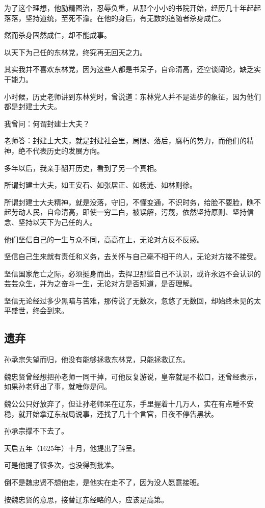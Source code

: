 \begin{multicols}{\theparacolNo}
为了这个理想，他励精图治，忍辱负重，从那个小小的书院开始，经历几十年起起落落，坚持道统，至死不渝。在他的身后，有无数的追随者杀身成仁。

然而杀身固然成仁，却不能成事。

以天下为己任的东林党，终究再无回天之力。

其实我并不喜欢东林党，因为这些人都是书呆子，自命清高，还空谈阔论，缺乏实干能力。

小时候，历史老师讲到东林党时，曾说道：东林党人并不是进步的象征，因为他们都是封建士大夫。

我曾问：何谓封建士大夫？

老师答：封建士大夫，就是封建社会里，局限、落后，腐朽的势力，而他们的精神，绝不代表历史的发展方向。

多年以后，我亲手翻开历史，看到了另一个真相。

所谓封建士大夫，如王安石、如张居正、如杨涟、如林则徐。

所谓封建士大夫精神，就是没落，守旧，不懂变通，不识时务，给脸不要脸，瞧不起劳动人民，自命清高，即使一穷二白，被误解，污蔑，依然坚持原则、坚持信念、坚持以天下为己任的人。

他们坚信自己的一生与众不同，高高在上，无论对方反不反感。

坚信自己生来就有责任和义务，去关怀与自己毫不相干的人，无论对方接不接受。

坚信国家危亡之际，必须挺身而出，去捍卫那些自己不认识，或许永远不会认识的芸芸众生，并为之奋斗一生，无论对方是否知道，是否理解。

坚信无论经过多少黑暗与苦难，那传说了无数次，忽悠了无数回，却始终未见的太平盛世，终会到来。

\subsection{遗弃}
孙承宗失望而归，他没有能够拯救东林党，只能拯救辽东。

魏忠贤曾经想把孙老师一同干掉，可他反复游说，皇帝就是不松口，还曾经表示，如果孙老师出了事，就唯你是问。

魏公公只好放弃了，但让孙老师呆在辽东，手里握着十几万人，实在有点睡不安稳，就开始拿辽东战局说事，还找了几十个言官，日夜不停告黑状。

孙承宗撑不下去了。

天启五年（1625年）十月，他提出了辞呈。

可是他提了很多次，也没得到批准。

倒不是魏忠贤不想他走，是他实在走不了，因为没人愿意接班。

按魏忠贤的意思，接替辽东经略的人，应该是高第。


\end{multicols}
